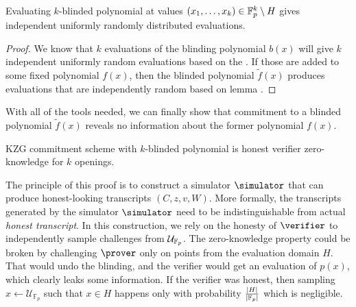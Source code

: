 \begin{lemma}
\label{lemma:blinded-kwise-eval}
    Evaluating $k$-blinded polynomial at values $(x_1, \ldots, x_k) \in \mathbb{F}_p^k \setminus H$ gives independent uniformly randomly distributed evaluations.
\end{lemma}

\begin{proof}
    We know that $k$ evaluations of the blinding polynomial $b(x)$ will give $k$ independent uniformly random evaluations based on the . If those are added to some fixed polynomial $f(x)$, then the blinded polynomial $\widetilde{f}(x)$ produces evaluations that are independently random based on lemma .
\end{proof}

With all of the tools needed, we can finally show that commitment to a blinded polynomial $\widetilde{f}(x)$ reveals no information about the former polynomial $f(x)$. 

\begin{theorem}
\label{theorem:blinding}
    KZG commitment scheme with $k$-blinded polynomial is honest verifier zero-knowledge for $k$ openings.
\end{theorem}

The principle of this proof is to construct a simulator $\simulator$ that can produce honest-looking transcripts $(C, z, v, W)$. More formally, the transcripts generated by the simulator $\simulator$ need to be indistinguishable from actual \textit{honest transcript}. In this construction, we rely on the honesty of $\verifier$ to independently sample challenges from $\mathcal{U}_{\mathbb{F}_p}$. The zero-knowledge property could be broken by challenging $\prover$ only on points from the evaluation domain $H$. That would undo the blinding, and the verifier would get an evaluation of $p(x)$, which clearly leaks some information. If the verifier was honest, then sampling $x \gets \mathcal{U}_{\mathbb{F}_p}$ such that $x \in H$ happens only with probability $\frac{|H|}{|\mathbb{F}_p|}$ which is negligible.


